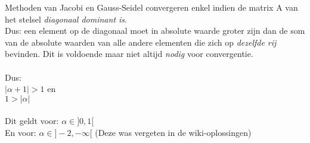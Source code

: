 Methoden van Jacobi en Gauss-Seidel convergeren enkel indien de matrix A van het stelsel \textit{diagonaal dominant is}.\\
Dus: een element op de diagonaal moet in absolute waarde groter zijn dan de som van de absolute waarden van alle andere elementen die zich op \textit{dezelfde rij} bevinden. Dit is voldoende maar niet altijd \textit{nodig} voor convergentie.\\\\
Dus:\\
$|\alpha+1| > 1$ en\\
$1 > |\alpha|$\\\\
Dit geldt voor:
$\alpha \in ]0,1[$\\
En voor: 
$\alpha \in ]-2,-\infty[$ (Deze was vergeten in de wiki-oplossingen)